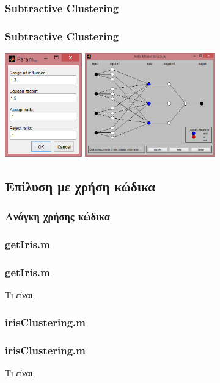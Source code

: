 \documentclass[xetex,serif,mathserif,14pt]{beamer}
\begin{document}
\subsubsection{Subtractive Clustering}
\begin{frame}
\frametitle{Subtractive Clustering}
\centering
\includegraphics[height=4.5cm]{images/subParam.png}
\includegraphics[height=4.5cm]{images/anfisModelSub.png}
\end{frame}
\subsection{Επίλυση με χρήση κώδικα}

\begin{frame}
\frametitle{Ανάγκη χρήσης κώδικα}

\end{frame}

\subsubsection{getIris.m}
\begin{frame}
\frametitle{getIris.m}
Τι είναι;
\end{frame}


\subsubsection{irisClustering.m}
\begin{frame}
\frametitle{irisClustering.m}
Τι είναι;
\end{frame}
\end{document}
